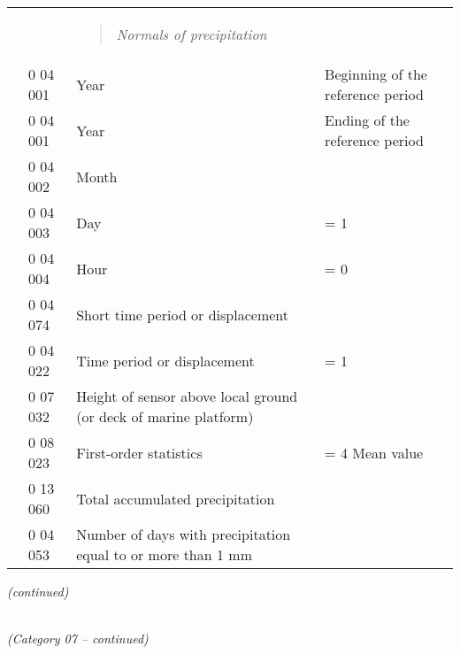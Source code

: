 \begin{longtable}[]{@{}llll@{}}
\begin{minipage}[t]{0.22\columnwidth}\raggedright
\strut
\end{minipage} & \begin{minipage}[t]{0.22\columnwidth}\raggedright
\strut
\end{minipage} & \begin{minipage}[t]{0.22\columnwidth}\raggedright
\begin{quote}
\emph{Normals of precipitation}
\end{quote}\strut
\end{minipage} & \begin{minipage}[t]{0.22\columnwidth}\raggedright
\strut
\end{minipage}\tabularnewline
& 0 04 001 & Year & Beginning of the reference period\tabularnewline
& 0 04 001 & Year & Ending of the reference period\tabularnewline
& 0 04 002 & Month &\tabularnewline
& 0 04 003 & Day & = 1\tabularnewline
& 0 04 004 & Hour & = 0\tabularnewline
& 0 04 074 & Short time period or displacement &\tabularnewline
& 0 04 022 & Time period or displacement & = 1\tabularnewline
& 0 07 032 & Height of sensor above local ground (or deck of marine platform) &\tabularnewline
& 0 08 023 & First-order statistics & = 4 Mean value\tabularnewline
& 0 13 060 & Total accumulated precipitation &\tabularnewline
& 0 04 053 & Number of days with precipitation equal to or more than 1 mm &\tabularnewline
\bottomrule
\end{longtable}

\emph{(continued)}

\emph{\\
(Category 07 -- continued)}

